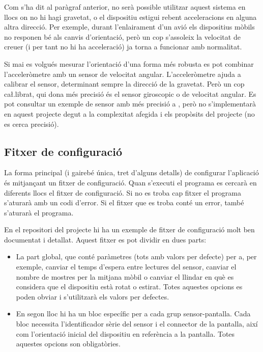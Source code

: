 Com s'ha dit al paràgraf anterior, no serà possible utilitzar aquest sistema en
llocs on no hi hagi gravetat, o el dispositiu estigui rebent acceleracions en
alguna altra direcció. Per exemple, durant l'enlairament d'un avió els
dispositius mòbils no responen bé als canvis d'orientació, però un cop
s'assoleix la velocitat de creuer (i per tant no hi ha acceleració) ja torna
a funcionar amb normalitat.

Si mai es volgués mesurar l'orientació d'una forma més robusta es pot combinar
l'acceleròmetre amb un sensor de velocitat angular. L'acceleròmetre ajuda a
calibrar el sensor, determinant sempre la direcció de la gravetat. Però un
cop ca\l.librat, qui dona més precisió és el sensor giroscopic o de velocitat
angular. Es pot consultar un exemple de sensor amb més precisió a
\cite{6702711}, però no
s'implementarà en aquest projecte degut a la complexitat afegida i els propòsits
del projecte (no es cerca precisió).

\subsection{Fitxer de configuració}

La forma principal (i gairebé única, tret d'alguns detalls) de configurar
l'aplicació és mitjançant un fitxer de configuració. Quan s'executi el programa
es cercarà en diferents llocs el fitxer de configuració. Si no es troba cap
fitxer el programa s'aturarà amb un codi d'error. Si el fitxer que es troba
conté un error, també s'aturarà el programa.

En el repositori del projecte hi ha un exemple de fitxer de configuració molt
ben documentat i detallat. Aquest fitxer es pot dividir en dues parts:

\begin{itemize}
    \item La part global, que conté paràmetres (tots amb valors per defecte) per
    a, per exemple, canviar el temps d'espera entre lectures del sensor, canviar
    el nombre de mostres per la mitjana mòbil o canviar el llindar en què es
    considera que el dispositiu està rotat o estirat. Totes aquestes opcions es
    poden obviar i s'utilitzarà els valors per defectes.
    \item En segon lloc hi ha un bloc específic per a cada grup sensor-pantalla.
    Cada bloc necessita l'identificador sèrie del sensor i el connector de la
    pantalla, així com l'orientació inicial del dispositiu en referència a la
    pantalla. Totes aquestes opcions son obligatòries.
\end{itemize}

